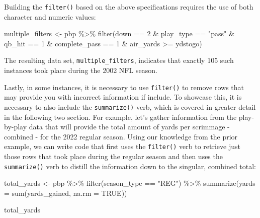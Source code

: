 \documentclass[
  letterpaper,
]{krantz}
\newenvironment{Shaded}{\begin{snugshade}}{\end{snugshade}}
\newcommand{\AttributeTok}[1]{\textcolor[rgb]{0.40,0.45,0.13}{#1}}
\newcommand{\ConstantTok}[1]{\textcolor[rgb]{0.56,0.35,0.01}{#1}}
\newcommand{\DecValTok}[1]{\textcolor[rgb]{0.68,0.00,0.00}{#1}}
\newcommand{\FunctionTok}[1]{\textcolor[rgb]{0.28,0.35,0.67}{#1}}
\newcommand{\NormalTok}[1]{\textcolor[rgb]{0.00,0.23,0.31}{#1}}
\newcommand{\OtherTok}[1]{\textcolor[rgb]{0.00,0.23,0.31}{#1}}
\newcommand{\SpecialCharTok}[1]{\textcolor[rgb]{0.37,0.37,0.37}{#1}}
\newcommand{\StringTok}[1]{\textcolor[rgb]{0.13,0.47,0.30}{#1}}
\begin{document}
Building the \texttt{filter()} based on the above specifications
requires the use of both character and numeric values:

\begin{Shaded}
\begin{Highlighting}[]
\NormalTok{multiple\_filters }\OtherTok{\textless{}{-}}\NormalTok{ pbp }\SpecialCharTok{\%\textgreater{}\%}
  \FunctionTok{filter}\NormalTok{(down }\SpecialCharTok{==} \DecValTok{2} \SpecialCharTok{\&}\NormalTok{ play\_type }\SpecialCharTok{==} \StringTok{"pass"} \SpecialCharTok{\&}
\NormalTok{           qb\_hit }\SpecialCharTok{==} \DecValTok{1} \SpecialCharTok{\&}
\NormalTok{           complete\_pass }\SpecialCharTok{==} \DecValTok{1} \SpecialCharTok{\&} 
\NormalTok{           air\_yards }\SpecialCharTok{\textgreater{}=}\NormalTok{ ydstogo)}
\end{Highlighting}
\end{Shaded}

The resulting data set, \texttt{multiple\_filters}, indicates that
exactly 105 such instances took place during the 2002 NFL season.

Lastly, in some instances, it is necessary to use \texttt{filter()} to
remove rows that may provide you with incorrect information if include.
To showcase this, it is necessary to also include the
\texttt{summarize()} verb, which is covered in greater detail in the
following two section. For example, let's gather information from the
play-by-play data that will provide the total amount of yards per
scrimmage - combined - for the 2022 regular season. Using our knowledge
from the prior example, we can write code that first uses the
\texttt{filter()} verb to retrieve just those rows that took place
during the regular season and then uses the \texttt{summarize()} verb to
distill the information down to the singular, combined total:

\begin{Shaded}
\begin{Highlighting}[]
\NormalTok{total\_yards }\OtherTok{\textless{}{-}}\NormalTok{ pbp }\SpecialCharTok{\%\textgreater{}\%}
  \FunctionTok{filter}\NormalTok{(season\_type }\SpecialCharTok{==} \StringTok{"REG"}\NormalTok{) }\SpecialCharTok{\%\textgreater{}\%}
  \FunctionTok{summarize}\NormalTok{(}\AttributeTok{yards =} \FunctionTok{sum}\NormalTok{(yards\_gained, }\AttributeTok{na.rm =} \ConstantTok{TRUE}\NormalTok{))}

\NormalTok{total\_yards}
\end{Highlighting}
\end{Shaded}
\end{document}
